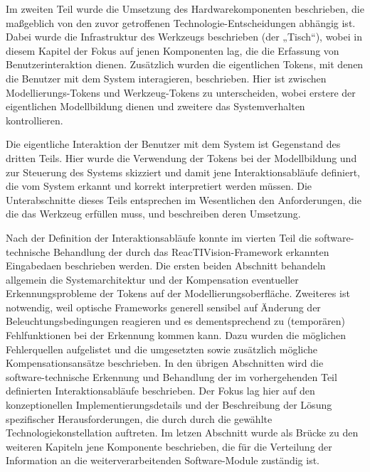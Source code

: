 Im zweiten Teil wurde die Umsetzung des Hardwarekomponenten beschrieben, die maßgeblich von den zuvor getroffenen Technologie-Entscheidungen abhängig ist. Dabei wurde die Infrastruktur des Werkzeugs beschrieben (der „Tisch“), wobei in diesem Kapitel der Fokus auf jenen Komponenten lag, die die Erfassung von Benutzerinteraktion dienen. Zusätzlich wurden die eigentlichen Tokens, mit denen die Benutzer mit dem System interagieren, beschrieben. Hier ist zwischen Modellierungs-Tokens und Werkzeug-Tokens zu unterscheiden, wobei erstere der eigentlichen Modellbildung dienen und zweitere das Systemverhalten kontrollieren.

Die eigentliche Interaktion der Benutzer mit dem System ist Gegenstand des dritten Teils. Hier wurde die Verwendung der Tokens bei der Modellbildung und zur Steuerung des Systems skizziert und damit jene Interaktionsabläufe definiert, die vom System erkannt und korrekt interpretiert werden müssen. Die Unterabschnitte dieses Teils entsprechen im Wesentlichen den Anforderungen, die die das Werkzeug erfüllen muss, und beschreiben deren Umsetzung.

Nach der Definition der Interaktionsabläufe konnte im vierten Teil die software-technische Behandlung der durch das ReacTIVision-Framework erkannten Eingabedaen beschrieben werden. Die ersten beiden Abschnitt behandeln allgemein die Systemarchitektur und der Kompensation eventueller Erkennungsprobleme der Tokens auf der Modellierungsoberfläche. Zweiteres ist notwendig, weil optische Frameworks generell sensibel auf Änderung der Beleuchtungsbedingungen reagieren und es dementsprechend zu (temporären) Fehlfunktionen bei der Erkennung kommen kann. Dazu wurden die möglichen Fehlerquellen aufgelistet und die umgesetzten sowie zusätzlich mögliche Kompensationsansätze beschrieben. In den übrigen Abschnitten wird die software-technische Erkennung und Behandlung der im vorhergehenden Teil definierten Interaktionsabläufe beschrieben. Der Fokus lag hier auf den konzeptionellen Implementierungsdetails und der Beschreibung der Lösung spezifischer Herausforderungen, die durch durch die gewählte Technologiekonstellation auftreten. Im letzen Abschnitt wurde als Brücke zu den weiteren Kapiteln jene Komponente beschrieben, die für die Verteilung der Information an die weiterverarbeitenden Software-Module zuständig ist.


